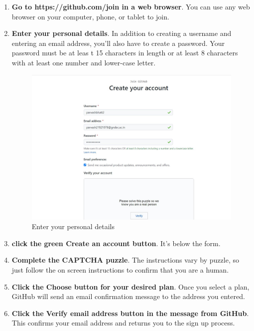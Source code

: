 \documentclass[12pt]{article}
\begin{document}
\begin{enumerate}
\item  \textbf{Go to https://github.com/join in a web browser}. You can use any web browser on your
computer, phone, or tablet to join.

\item \textbf{Enter your personal details}. In addition to creating a username and entering an email address,
you'll also have to create a password. Your password must be at leas t 15 characters in length or at least 8 characters with at least one number and lower-case letter. 

\begin{figure}[H]
\centering
\includegraphics[scale=0.5]{p2createaccount}
\caption{Enter your personal details}
\label{gitinstall6}
\vspace{0.6\baselineskip}
\end{figure}


\item \textbf{click the green Create an account button}. It's below the form.

\item \textbf{Complete the CAPTCHA puzzle}. The instructions vary by puzzle, so just follow the on screen instructions to confirm that you are a human.

\item \textbf{Click the Choose button for your desired plan}. Once you select a plan, GitHub will send an email confirmation message to the address you entered.

\item \textbf{Click the Verify email address button in the message from GitHub}. This confirms your email address and returns you to the sign up process.


\end{enumerate}
\end{document}
